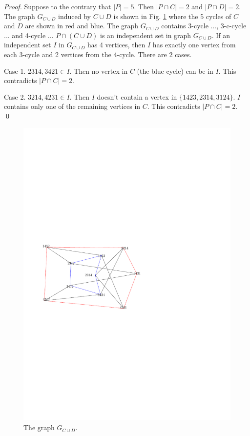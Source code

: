 \documentclass[runningheads]{llncs}
\begin{document}
\begin{proof}
Suppose to the contrary that $|P|=5$.
Then $|P\cap C|=2$ and $|P\cap D|=2$.
The graph $G_{C\cup D}$ induced by $C\cup D$ is shown in Fig. \ref{f55} where the 5 cycles of $C$ and $D$ are shown in red and blue.
The graph $G_{C\cup D}$ contains 3-cycle ..., 3-c-cycle ... and 4-cycle ...
$P\cap (C\cup D)$ is an independent set in graph $G_{C\cup D}$.
If an independent set $I$ in $G_{C\cup D}$ has  4 vertices, then $I$ has exactly one vertex from each 3-cycle and 2 vertices from the 4-cycle. There are 2 cases.

Case 1. $2314,3421\in I$. 
Then no vertex in $C$ (the blue cycle) can be in $I$. This contradicts $|P\cap C|=2$.

Case 2. $3214,4231\in I$. 
Then $I$ doesn't contain a vertex in $\{1423,2314,3124\}$. $I$ contains only one of the remaining vertices in $C$. This contradicts $|P\cap C|=2$.
\qed\end{proof}

\begin{figure}[ht]
  \centering
  \includegraphics[scale=0.7]{f55.pdf}
  \caption{The graph $G_{C\cup D}$.}
  \label{f55}
\end{figure}
\end{document}
